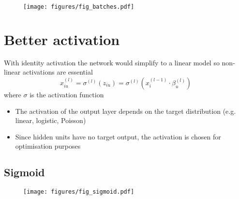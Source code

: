 \documentclass[c]{beamer}
\begin{document}
\begin{frame}{\secsubname}
	\begin{figure}
		\texttt{[image: figures/fig\_batches.pdf]}
	\end{figure}
\end{frame}

\section{Better activation}

\begin{frame}{\secname}
	With identity activation the network would simplify to a linear model so non-linear activations are essential
	\begin{equation*}
		x^{(l)}_{iu} = \sigma^{(l)}\left(z_{iu}\right) = \sigma^{(l)}\left(x_i^{(l-1)} \cdot \beta^{(l)}_u \right)
	\end{equation*}
	where $\sigma$ is the activation function
	\begin{itemize}
		\item The activation of the output layer depends on the target distribution (e.g. linear, logistic, Poisson)
		\item Since hidden units have no target output, the activation is chosen for optimisation purposes
	\end{itemize}
\end{frame}

\subsection{Sigmoid}

\begin{frame}{\secsubname}
	\begin{figure}
		\texttt{[image: figures/fig\_sigmoid.pdf]}
	\end{figure}
\end{frame}
\end{document}
